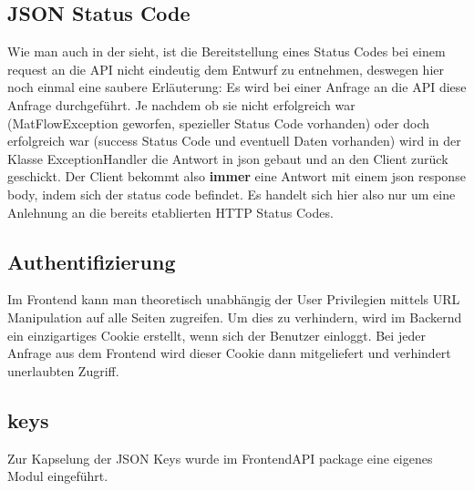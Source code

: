 \subsection{JSON Status Code}
Wie man auch in der  sieht, ist die Bereitstellung eines Status Codes bei einem request an die API nicht eindeutig
dem Entwurf zu entnehmen, deswegen hier noch einmal eine saubere Erläuterung:
Es wird bei einer Anfrage an die API diese Anfrage durchgeführt. Je nachdem ob sie nicht erfolgreich war (MatFlowException 
geworfen, spezieller Status Code vorhanden) oder doch erfolgreich war (success Status Code und eventuell Daten vorhanden) 
wird in der Klasse ExceptionHandler die Antwort in json gebaut und an den Client zurück geschickt. 
Der Client bekommt also \textbf{immer} eine Antwort mit einem json response body, indem sich der status code befindet. 
Es handelt sich hier also nur um eine Anlehnung an die bereits etablierten HTTP Status Codes.

\subsection{Authentifizierung} \label{Cookie}
Im Frontend kann man theoretisch unabhängig der User Privilegien mittels URL Manipulation auf alle 
Seiten zugreifen. Um dies zu verhindern, wird im Backernd ein einzigartiges Cookie erstellt, wenn sich der Benutzer einloggt. 
Bei jeder Anfrage aus dem Frontend wird dieser Cookie dann mitgeliefert und verhindert unerlaubten Zugriff.

\subsection{keys} \label{Cookie}
Zur Kapselung der JSON Keys wurde im FrontendAPI package eine eigenes Modul eingeführt.








